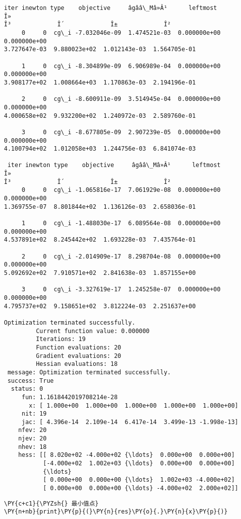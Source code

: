 \begin{Verbatim}[commandchars=\\\{\}]
 iter inewton type    objective     âgââ\_Mâ»Â¹      leftmost         Î»
Î³             Î´             Î±             Î²
     0     0  cg\_i -7.032046e-09  1.474521e-03  0.000000e+00  0.000000e+00
3.727647e-03  9.880023e+02  1.012143e-03  1.564705e-01

     1     0  cg\_i -8.304899e-09  6.906989e-04  0.000000e+00  0.000000e+00
3.908177e+02  1.008664e+03  1.170863e-03  2.194196e-01

     2     0  cg\_i -8.600911e-09  3.514945e-04  0.000000e+00  0.000000e+00
4.000658e+02  9.932200e+02  1.240972e-03  2.589760e-01

     3     0  cg\_i -8.677805e-09  2.907239e-05  0.000000e+00  0.000000e+00
4.100794e+02  1.012058e+03  1.244756e-03  6.841074e-03

 iter inewton type    objective     âgââ\_Mâ»Â¹      leftmost         Î»
Î³             Î´             Î±             Î²
     0     0  cg\_i -1.065816e-17  7.061929e-08  0.000000e+00  0.000000e+00
1.369755e-07  8.801844e+02  1.136126e-03  2.658036e-01

     1     0  cg\_i -1.488030e-17  6.089564e-08  0.000000e+00  0.000000e+00
4.537891e+02  8.245442e+02  1.693228e-03  7.435764e-01

     2     0  cg\_i -2.014909e-17  8.298704e-08  0.000000e+00  0.000000e+00
5.092692e+02  7.910571e+02  2.841638e-03  1.857155e+00

     3     0  cg\_i -3.327619e-17  1.245258e-07  0.000000e+00  0.000000e+00
4.795737e+02  9.158651e+02  3.812224e-03  2.251637e+00

Optimization terminated successfully.
         Current function value: 0.000000
         Iterations: 19
         Function evaluations: 20
         Gradient evaluations: 20
         Hessian evaluations: 18
 message: Optimization terminated successfully.
 success: True
  status: 0
     fun: 1.1618442019708214e-28
       x: [ 1.000e+00  1.000e+00  1.000e+00  1.000e+00  1.000e+00]
     nit: 19
     jac: [ 4.396e-14  2.109e-14  6.417e-14  3.499e-13 -1.998e-13]
    nfev: 20
    njev: 20
    nhev: 18
    hess: [[ 8.020e+02 -4.000e+02 {\ldots}  0.000e+00  0.000e+00]
           [-4.000e+02  1.002e+03 {\ldots}  0.000e+00  0.000e+00]
           {\ldots}
           [ 0.000e+00  0.000e+00 {\ldots}  1.002e+03 -4.000e+02]
           [ 0.000e+00  0.000e+00 {\ldots} -4.000e+02  2.000e+02]]
    \end{Verbatim}

    \begin{tcolorbox}[breakable, size=fbox, boxrule=1pt, pad at break*=1mm,colback=cellbackground, colframe=cellborder]
\begin{Verbatim}[commandchars=\\\{\}]
\PY{c+c1}{\PYZsh{} 最小值点}
\PY{n+nb}{print}\PY{p}{(}\PY{n}{res}\PY{o}{.}\PY{n}{x}\PY{p}{)}
\end{Verbatim}
\end{tcolorbox}

